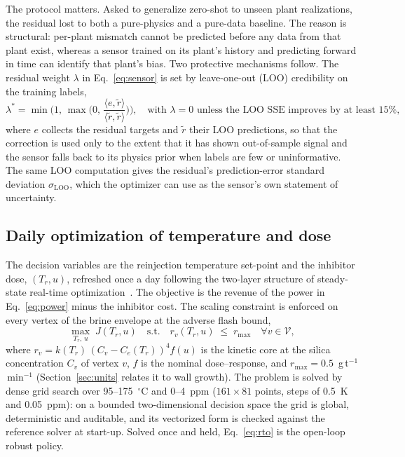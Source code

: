 The protocol matters. Asked to generalize zero-shot to unseen plant
realizations, the residual lost to both a pure-physics and a pure-data
baseline. The reason is structural: per-plant mismatch cannot be
predicted before any data from that plant exist, whereas a sensor
trained on its plant's history and predicting forward in time can
identify that plant's bias. Two protective mechanisms follow. The
residual weight $\lambda$ in Eq.~\eqref{eq:sensor} is set by
leave-one-out (LOO) credibility on the training labels,
\begin{equation}\label{eq:lambda}
\lambda^{\ast} = \min\!\Big(1,\, \max\!\Big(0,\,
\frac{\langle e, \tilde r\rangle}{\langle \tilde r, \tilde r\rangle}\Big)\Big),
\quad \text{with } \lambda = 0 \text{ unless the LOO SSE improves by at least } 15\%,
\end{equation}
where $e$ collects the residual targets and $\tilde r$ their LOO
predictions, so that the correction is used only to the extent that it
has shown out-of-sample signal and the sensor falls back to its physics
prior when labels are few or uninformative. The same LOO computation
gives the residual's prediction-error standard deviation
$\sigma_{\mathrm{LOO}}$, which the optimizer can use as the sensor's
own statement of uncertainty.

\subsection{Daily optimization of temperature and dose}\label{sec:rto}

The decision variables are the reinjection temperature set-point and
the inhibitor dose, $(T_r, u)$, refreshed once a day following the
two-layer structure of steady-state real-time
optimization~\citep{darby2011rto}. The objective is the revenue of the
power in Eq.~\eqref{eq:power} minus the inhibitor cost. The scaling
constraint is enforced on every vertex of the brine envelope at the
adverse flash bound,
\begin{equation}\label{eq:rto}
\max_{T_r,\,u}\; J(T_r, u)
\quad \text{s.t.} \quad
r_v(T_r, u) \;\le\; r_{\max} \quad \forall v \in \mathcal{V},
\end{equation}
where $r_v = k(T_r)\,(C_v - C_e(T_r))^4 f(u)$ is the kinetic core at
the silica concentration $C_v$ of vertex $v$, $f$ is the nominal
dose--response, and $r_{\max} = 0.5$~g\,t$^{-1}$\,min$^{-1}$
(Section~\ref{sec:units} relates it to wall growth). The problem is
solved by dense grid search over 95--175~$^{\circ}$C and 0--4~ppm
($161 \times 81$ points, steps of 0.5~K and 0.05~ppm): on a bounded
two-dimensional decision space the grid is global, deterministic and
auditable, and its vectorized form is checked against the reference
solver at start-up. Solved once and held, Eq.~\eqref{eq:rto} is the
open-loop robust policy.

